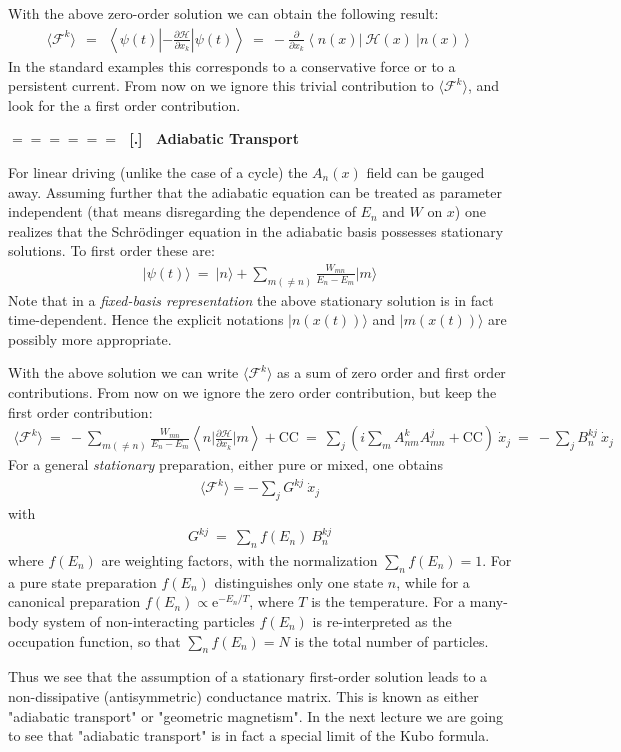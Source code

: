 \documentclass[onecolumn,fleqn]{revtex4}
\newcommand{\eexp}{\mathrm{e}^}
\newcommand{\beq}{\begin{eqnarray}}
\newcommand{\eeq}{\end{eqnarray}}
\renewcommand{\thesubsection}{\arabic{subsection}}
\renewcommand{\thesubsubsection}{\arabic{subsubsection}}
\newcommand{\sheadC}[1]
{
\addtocounter{subsubsection}{1}
\vspace{5mm}
{\Large\bf $=\!=\!=\!=\!=\!=\;$ [\thesubsection.\thesubsubsection] \ #1}  
\nopagebreak
\phantomsection
}
\begin{document}
With the above zero-order solution
we can obtain the following result:
\beq
\langle \mathcal{F}^k \rangle \ \ = \ \
\left\langle  \psi(t)   
\left|-\frac{\partial \mathcal{H}}{\partial x_k}  
\right| \psi(t)  \right\rangle
\ = \ 
-\frac{\partial}{\partial x_k}
\left\langle n(x)|\ \mathcal{H}(x) \ |n(x)\right\rangle
\eeq
In the standard examples this corresponds to a conservative force 
or to a persistent current. From now on we ignore this
trivial contribution to $\langle \mathcal{F}^k \rangle$,
and look for the a first order contribution.



\sheadC{Adiabatic Transport}

For linear driving (unlike the case of a cycle) the
$A_n(x)$ field can be gauged away.
Assuming further that the adiabatic equation
can be treated as parameter independent
(that means disregarding the dependence
of $E_n$ and ${W}$ on $x$) one realizes
that the Schr\"{o}dinger equation in the adiabatic basis 
possesses stationary solutions.
To first order these are:
\beq
| \psi(t) \rangle \ = \
|n\rangle +
\sum_{m(\ne n)}
\frac{W_{mn}}
{E_n-E_m} |m\rangle
\eeq
Note that in a {\em fixed-basis representation}
the above stationary solution is in fact time-dependent.
Hence the explicit notations $|n(x(t))\rangle$ 
and $|m(x(t))\rangle$ are possibly more appropriate.


With the above solution
we can write $\langle \mathcal{F}^k \rangle$ as a sum of
zero order and first order contributions.
From now on we ignore the
zero order contribution,
but keep the first order contribution:
\beq
\langle \mathcal{F}^k \rangle 
\ = \
-\sum_{m(\ne n)}
\frac{W_{mn}}{E_n-E_m}
\left\langle n \Big|
\frac{\partial \mathcal{H}}{\partial x_k}
\Big| m \right\rangle + \mbox{CC}
\ = \ 
\sum_j \left(i\sum_{m}
A^k_{nm} A^{j}_{mn} + \mbox{CC}\right) \ \dot{x}_j
\ = \ 
-\sum_j B_n^{kj} \ \dot{x}_j
\eeq
For a general {\em stationary} preparation,
either pure or mixed, one obtains 
\beq
\langle \mathcal{F}^k \rangle = -\sum_j G^{kj} \ \dot{x}_j
\eeq
with
\beq
G^{kj} \ = \ \sum_n f(E_n) \ B_n^{kj}
\eeq
where $f(E_n)$ are weighting factors,
with the normalization $\sum_n f(E_n)=1$.
For a pure state preparation $f(E_n)$ distinguishes
only one state $n$, while for a canonical
preparation $f(E_n)\propto\eexp{-E_n/T}$,
where $T$ is the temperature.
For a many-body system of non-interacting particles 
$f(E_n)$ is re-interpreted as
the occupation function,
so that $\sum_n f(E_n)=N$ is the total
number of particles.

Thus we see that the assumption of a stationary
first-order solution leads to a non-dissipative (antisymmetric)
conductance matrix. This is known as either
"adiabatic transport" or "geometric magnetism".
In the next lecture we are going to see 
that "adiabatic transport" is in fact a special limit 
of the Kubo formula. 
\end{document}
